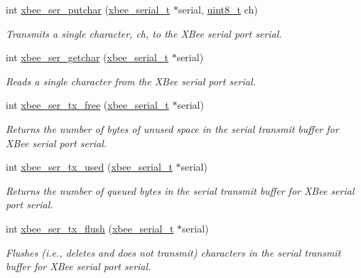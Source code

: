 \begin{DoxyCompactItemize}
int \hyperlink{group__xbee__serial_ga86fea2345efb8bf9424228f0979b1849}{xbee\-\_\-ser\-\_\-putchar} (\hyperlink{structxbee__serial__t}{xbee\-\_\-serial\-\_\-t} $\ast$serial, \hyperlink{group__hal_gae1affc9ca37cfb624959c866a73f83c2}{uint8\-\_\-t} ch)
\begin{DoxyCompactList}\small\item\em Transmits a single character, {\itshape ch}, to the X\-Bee serial port {\itshape serial}. \end{DoxyCompactList}\item 
int \hyperlink{group__xbee__serial_gaeeb38154313a44f86146cdcfe08e7d08}{xbee\-\_\-ser\-\_\-getchar} (\hyperlink{structxbee__serial__t}{xbee\-\_\-serial\-\_\-t} $\ast$serial)
\begin{DoxyCompactList}\small\item\em Reads a single character from the X\-Bee serial port {\itshape serial}. \end{DoxyCompactList}\item 
int \hyperlink{group__xbee__serial_ga3ad8f378b572d6fec982f1086bd3b94f}{xbee\-\_\-ser\-\_\-tx\-\_\-free} (\hyperlink{structxbee__serial__t}{xbee\-\_\-serial\-\_\-t} $\ast$serial)
\begin{DoxyCompactList}\small\item\em Returns the number of bytes of unused space in the serial transmit buffer for X\-Bee serial port {\itshape serial}. \end{DoxyCompactList}\item 
int \hyperlink{group__xbee__serial_gaabf70934d186354cde4ac14ed27d1bd2}{xbee\-\_\-ser\-\_\-tx\-\_\-used} (\hyperlink{structxbee__serial__t}{xbee\-\_\-serial\-\_\-t} $\ast$serial)
\begin{DoxyCompactList}\small\item\em Returns the number of queued bytes in the serial transmit buffer for X\-Bee serial port {\itshape serial}. \end{DoxyCompactList}\item 
int \hyperlink{group__xbee__serial_ga05308d37301d27715f1e1308b7189220}{xbee\-\_\-ser\-\_\-tx\-\_\-flush} (\hyperlink{structxbee__serial__t}{xbee\-\_\-serial\-\_\-t} $\ast$serial)
\begin{DoxyCompactList}\small\item\em Flushes (i.\-e., deletes and does not transmit) characters in the serial transmit buffer for X\-Bee serial port {\itshape serial}. \end{DoxyCompactList}\item 

\end{DoxyCompactItemize}
